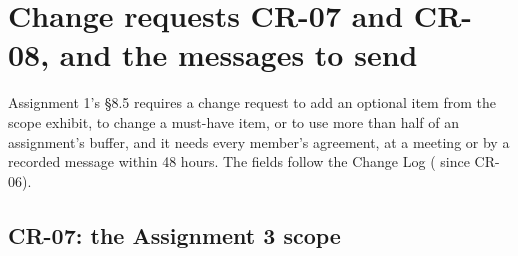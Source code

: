 \section{Change requests CR-07 and CR-08, and the messages to send}
\label{app:cr}

Assignment 1's §8.5 requires a change request to add an optional item from the scope exhibit, to
change a must-have item, or to use more than half of an assignment's buffer, and it needs every
member's agreement, at a meeting or by a recorded message within 48 hours. The fields follow the
Change Log ( since CR-06).

\subsection{CR-07: the Assignment 3 scope}

